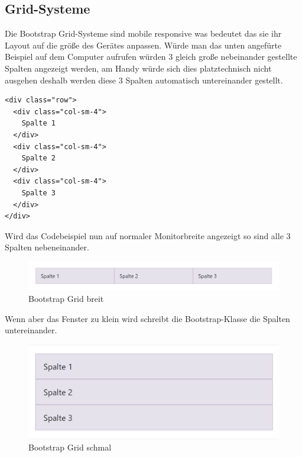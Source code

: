 \subsection{Grid-Systeme}
Die Bootstrap Grid-Systeme sind mobile responsive was bedeutet das sie ihr Layout auf die größe des Gerätes anpassen. Würde man das unten angefürte Beispiel auf dem Computer aufrufen würden 3 gleich große nebeinander gestellte Spalten angezeigt werden, am Handy würde sich dies platztechnisch nicht ausgehen deshalb werden diese 3 Spalten automatisch untereinander gestellt.
\begin{lstlisting}
<div class="row">
  <div class="col-sm-4">
  	Spalte 1
  </div>
  <div class="col-sm-4">
  	Spalte 2
  </div>
  <div class="col-sm-4">
  	Spalte 3
  </div>
</div>
\end{lstlisting}
Wird das Codebeispiel nun auf normaler Monitorbreite angezeigt so sind alle 3 Spalten nebeneinander.
\begin{figure}[H]
\begin{center}
	\includegraphics[scale=.6]{images/bootstrap1.png}
\end{center}
	\caption{Bootstrap Grid breit}
	\label{fig:sample}
\end{figure}
Wenn aber das Fenster zu klein wird schreibt die Bootstrap-Klasse die Spalten untereinander.
\begin{figure}[H]
\begin{center}
	\includegraphics[scale=.6]{images/bootstrap2.png}
\end{center}
	\caption{Bootstrap Grid schmal}
	\label{fig:sample}
\end{figure}


